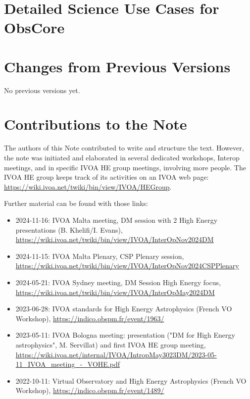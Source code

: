 \documentclass[11pt,a4paper]{ivoa}
\begin{document}
\section{Detailed Science Use Cases for ObsCore}




\section{Changes from Previous Versions}

No previous versions yet.


\section{Contributions to the Note}

The authors of this Note contributed to write and structure the text. However, the note was initiated and elaborated in several dedicated workshops, Interop meetings,  and in specific \gls{IVOA} \gls{HE} group meetings, involving more people. The \gls{IVOA} \gls{HE} group keeps track of its activities on an \gls{IVOA} web page: \url{https://wiki.ivoa.net/twiki/bin/view/IVOA/HEGroup}.

Further material can be found with those links:
\begin{itemize}
    \item 2024-11-16: IVOA Malta meeting, DM session with 2 High Energy presentations (B. Khelifi/I. Evans), \url{https://wiki.ivoa.net/twiki/bin/view/IVOA/InterOpNov2024DM}
    \item 2024-11-15: IVOA Malta Plenary, CSP Plenary session, \url{https://wiki.ivoa.net/twiki/bin/view/IVOA/InterOpNov2024CSPPlenary}
    \item 2024-05-21: IVOA Sydney meeting, DM Session High Energy focus, \url{https://wiki.ivoa.net/twiki/bin/view/IVOA/InterOpMay2024DM}
    \item 2023-06-28: IVOA standards for High Energy Astrophysics (French VO Workshop), \url{https://indico.obspm.fr/event/1963/}
    \item 2023-05-11: IVOA Bologna meeting: presentation ("DM for High Energy astrophysics", M. Servillat) and first IVOA HE group meeting, \url{https://wiki.ivoa.net/internal/IVOA/IntropMay3023DM/2023-05-11_IVOA_meeting_-_VOHE.pdf}
    \item 2022-10-11: Virtual Observatory and High Energy Astrophysics (French VO Workshop), \url{https://indico.obspm.fr/event/1489/}
\end{itemize}

\end{document}

